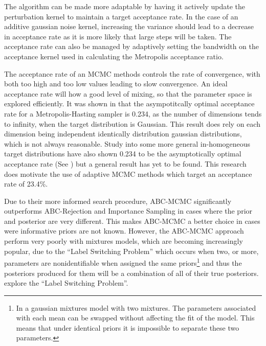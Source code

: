 \documentclass[11pt,a4paper]{article}
\theoremstyle{break}
\begin{document}
  \par The algorithm can be made more adaptable by having it actively update the perturbation kernel to maintain a target acceptance rate. In the case of an additive gaussian noise kernel, increasing the variance should lead to a decrease in acceptance rate as it is more likely that large steps will be taken. The acceptance rate can also be managed by adaptively setting the bandwidth on the acceptance kernel used in calculating the Metropolis acceptance ratio.

  \par The acceptance rate of an MCMC methods controls the rate of convergence, with both too high and too low values leading to slow convergence. An ideal acceptance rate will how a good level of mixing, so that the parameter space is explored efficiently. It was shown in \cite[]{weak_convergence_and_optimal_scaling_of_RWM_algorithms} that the asympotitcally optimal acceptance rate for a Metropolis-Hasting sampler is 0.234, as the number of dimensions tends to infinity, when the target distribution is Gaussian. This result does rely on each dimension being independent identically distribution gaussian distributions, which is not always reasonable. Study into some more general in-homogeneous target distributions have also shown 0.234 to be the asymptotically optimal acceptance rate (See \cite[]{optimal_scaling_for_various_metropolis_hastings_algorithms}) but a general result has yet to be found. This research does motivate the use of adaptive MCMC methods which target an acceptance rate of 23.4\%.

  \par Due to their more informed search procedure, ABC-MCMC significantly outperforms ABC-Rejection and Importance Sampling in cases where the prior and posterior are very different. This makes ABC-MCMC a better choice in cases were informative priors are not known. However, the ABC-MCMC approach perform very poorly with mixtures models, which are becoming increasingly popular, due to the ``Label Switching Problem'' \cite[]{mcmc_methods_and_the_label_switching_problem_in_bayesian_mixture_modeling} which occurs when two, or more, parameters are nonidentifiable when assigned the same priors\footnote{In a gaussian mixtures model with two mixtures. The parameters associated with each mean can be swapped without affecting the fit of the model. This means that under identical priors it is impossible to separate these two parameters.} and thus the posteriors produced for them will be a combination of all of their true posteriors. \cite[]{mcmc_methods_and_the_label_switching_problem_in_bayesian_mixture_modeling} explore the ``Label Switching Problem''.
\end{document}
